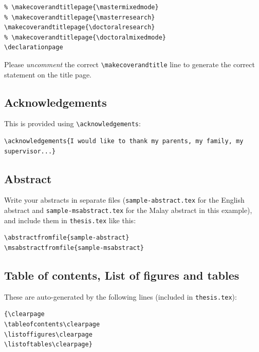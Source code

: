 \begin{lstlisting}[moretexcs={makecoverandtitlepage,copyrightpage,declarationpage}]
% \makecoverandtitlepage{\mastercoursework}
% \makecoverandtitlepage{\mastermixedmode}
% \makecoverandtitlepage{\masterresearch}
\makecoverandtitlepage{\doctoralresearch}
% \makecoverandtitlepage{\doctoralmixedmode}
\declarationpage
\end{lstlisting}

Please \emph{uncomment} the correct \verb|\makecoverandtitle| line to generate the correct statement on the title page.

\subsection{Acknowledgements}\label{sec:acknowledge}
This is provided using \verb|\acknowledgements|:


\begin{lstlisting}
\acknowledgements{I would like to thank my parents, my family, my supervisor...}
\end{lstlisting}

\subsection{Abstract}\label{sec:abstract}
Write your abstracts in separate files (\texttt{sample-abstract.tex} for the English abstract and \texttt{sample-msabstract.tex} for the Malay abstract in this example), and include them in \texttt{thesis.tex} like this:

\begin{lstlisting}[moretexcs={abstractfromfile,msabstractfromfile}]
\abstractfromfile{sample-abstract}
\msabstractfromfile{sample-msabstract}
\end{lstlisting}

\subsection{Table of contents, List of figures and tables}\label{sec:toc}

These are auto-generated by the following lines (included in \texttt{thesis.tex}):

\begin{lstlisting}[moretexcs={tableofcontents,listoftables,listoffigures}]
{\clearpage
\tableofcontents\clearpage
\listoffigures\clearpage
\listoftables\clearpage}
\end{lstlisting}


